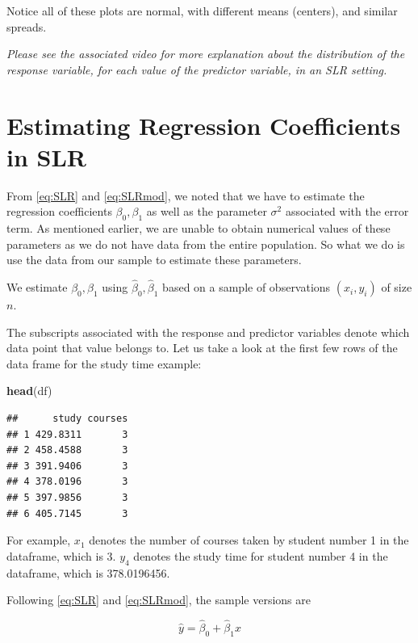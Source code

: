 \documentclass[
]{book}
\newenvironment{Shaded}{\begin{snugshade}}{\end{snugshade}}
\newcommand{\FunctionTok}[1]{\textcolor[rgb]{0.13,0.29,0.53}{\textbf{#1}}}
\newcommand{\NormalTok}[1]{#1}
\begin{document}
Notice all of these plots are normal, with different means (centers), and similar spreads.

\emph{Please see the associated video for more explanation about the distribution of the response variable, for each value of the predictor variable, in an SLR setting.}

\section{Estimating Regression Coefficients in SLR}\label{estimating-regression-coefficients-in-slr}

From \eqref{eq:SLR} and \eqref{eq:SLRmod}, we noted that we have to estimate the regression coefficients \(\beta_0, \beta_1\) as well as the parameter \(\sigma^2\) associated with the error term. As mentioned earlier, we are unable to obtain numerical values of these parameters as we do not have data from the entire population. So what we do is use the data from our sample to estimate these parameters.

We estimate \(\beta_0,\beta_1\) using \(\hat{\beta}_0,\hat{\beta}_1\) based on a sample of observations \((x_i,y_i)\) of size \(n\).

The subscripts associated with the response and predictor variables denote which data point that value belongs to. Let us take a look at the first few rows of the data frame for the study time example:

\begin{Shaded}
\begin{Highlighting}[]
\FunctionTok{head}\NormalTok{(df)}
\end{Highlighting}
\end{Shaded}

\begin{verbatim}
##      study courses
## 1 429.8311       3
## 2 458.4588       3
## 3 391.9406       3
## 4 378.0196       3
## 5 397.9856       3
## 6 405.7145       3
\end{verbatim}

For example, \(x_1\) denotes the number of courses taken by student number 1 in the dataframe, which is 3. \(y_4\) denotes the study time for student number 4 in the dataframe, which is 378.0196456.

Following \eqref{eq:SLR} and \eqref{eq:SLRmod}, the sample versions are

\begin{equation} 
\hat{y}=\hat{\beta}_0+\hat{\beta}_1 x
\label{eq:fitted}
\end{equation}
\end{document}

